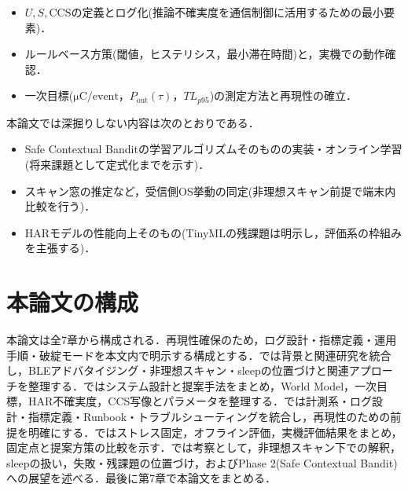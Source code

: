 \begin{itemize}
  \item $U,S,\mathrm{CCS}$の定義とログ化(推論不確実度を通信制御に活用するための最小要素)．
  \item ルールベース方策(閾値，ヒステリシス，最小滞在時間)と，実機での動作確認．
  \item 一次目標($\si{\micro\coulomb}/\text{event}$，$P_{\mathrm{out}}(\tau)$，$TL_{p95}$)の測定方法と再現性の確立．
\end{itemize}

本論文では深掘りしない内容は次のとおりである．
\begin{itemize}
  \item Safe Contextual Banditの学習アルゴリズムそのものの実装・オンライン学習(将来課題として定式化までを示す)．
  \item スキャン窓の推定など，受信側OS挙動の同定(非理想スキャン前提で端末内比較を行う)．
  \item HARモデルの性能向上そのもの(TinyMLの残課題は明示し，評価系の枠組みを主張する)．
\end{itemize}

\section{本論文の構成}
本論文は全7章から構成される．再現性確保のため，ログ設計・指標定義・運用手順・破綻モードを本文内で明示する構成とする．では背景と関連研究を統合し，BLEアドバタイジング・非理想スキャン・sleepの位置づけと関連アプローチを整理する．ではシステム設計と提案手法をまとめ，World Model，一次目標，HAR不確実度，CCS写像とパラメータを整理する．では計測系・ログ設計・指標定義・Runbook・トラブルシューティングを統合し，再現性のための前提を明確にする．ではストレス固定，オフライン評価，実機評価結果をまとめ，固定点と提案方策の比較を示す．では考察として，非理想スキャン下での解釈，sleepの扱い，失敗・残課題の位置づけ，およびPhase 2(Safe Contextual Bandit)への展望を述べる．最後に第7章で本論文をまとめる．

